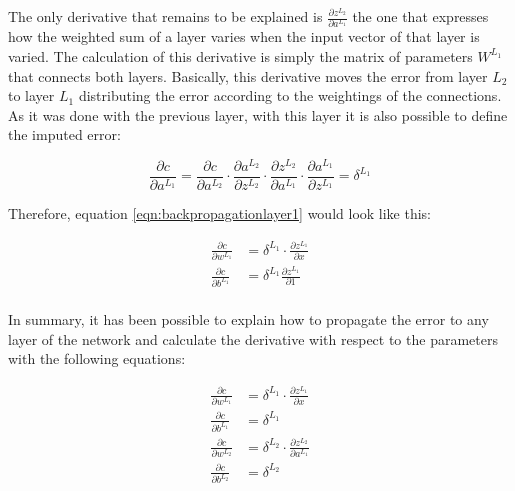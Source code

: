 The only derivative that remains to be explained is $\frac{\partial z^{L_2}}{\partial a^{L_1}}$ the one that expresses how the weighted sum of a layer varies when the input vector of that layer is varied. The calculation of this derivative is simply the matrix of parameters $W^{L_1}$ that connects both layers. Basically, this derivative moves the error from layer $L_2$ to layer $L_1$ distributing the error according to the weightings of the connections. As it was done with the previous layer, with this layer it is also possible to define the imputed error:


\begin{equation}
   \frac{\partial c}{\partial a^{L_1}} = \frac{\partial c}{\partial a^{L_2}} \cdot \frac{\partial a^{L_2}}{\partial z^{L_2}} \cdot \frac{\partial z^{L_2}}{\partial a^{L_1}} \cdot \frac{\partial a^{L_1}}{\partial z^{L_1}} = \delta^{L_1}
\end{equation}

Therefore, equation \ref{eqn:backpropagationlayer1} would look like this:

\begin{equation}
\begin{split}
     \frac{\partial c}{\partial w^{L_1}} &= \delta^{L_1} \cdot \frac{\partial z^{L_1}}{\partial x} \\
     \frac{\partial c}{\partial b^{L_1}} &= \delta^{L_1} \frac{\partial z^{L_1}}{\partial 1} \\
\end{split}
\end{equation}

In summary, it has been possible to explain how to propagate the error to any layer of the network and calculate the derivative with respect to the parameters with the following equations:

\begin{equation}
\begin{split}
     \frac{\partial c}{\partial w^{L_1}} &= \delta^{L_1} \cdot \frac{\partial z^{L_1}}{\partial x} \\
     \frac{\partial c}{\partial b^{L_1}} &= \delta^{L_1} \\
     \frac{\partial c}{\partial w^{L_2}} &= \delta^{L_2} \cdot \frac{\partial z^{L_2}}{\partial a^{L_1}} \\
     \frac{\partial c}{\partial b^{L_2}} &= \delta^{L_2}
\end{split}
\end{equation}

